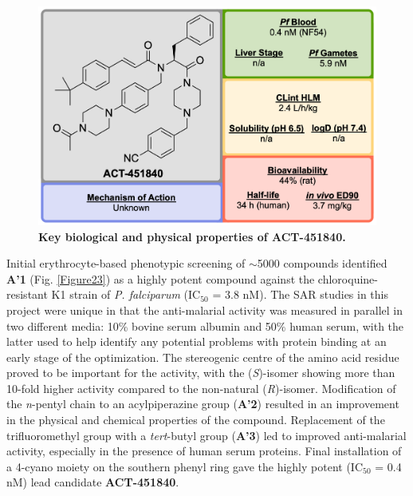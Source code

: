 \documentclass[twocolumn]{bmcart}%
\begin{document}
\begin{figure}[h]
	\includegraphics [scale=0.575] {Figure22}
	\caption{\bf Key biological and physical properties of ACT-451840.}
	\label{Figure22}
\end{figure}

Initial erythrocyte-based phenotypic screening of $\sim$5000 compounds identified \textbf{A'1} (Fig. \ref{Figure23}) as a highly potent compound against the chloroquine-resistant K1 strain of \textit{P. falciparum} (IC$_{50}$ = 3.8 nM). The SAR studies in this project were unique in that the anti-malarial activity was measured in parallel in two different media: 10\% bovine serum albumin and 50\% human serum, with the latter used to help identify any potential problems with protein binding at an early stage of the optimization. The stereogenic centre of the amino acid residue proved to be important for the activity, with the (\textit{S})-isomer showing more than 10-fold higher activity compared to the non-natural (\textit{R})-isomer. Modification of the \textit{n}-pentyl chain to an acylpiperazine group (\textbf{A'2}) resulted in an improvement in the physical and chemical properties of the compound. Replacement of the trifluoromethyl group with a \textit{tert}-butyl group (\textbf{A'3}) led to improved anti-malarial activity, especially in the presence of human serum proteins. Final installation of a 4-cyano moiety on the southern phenyl ring gave the highly potent (IC$_{50}$ = 0.4 nM) lead candidate \textbf{ACT-451840}.
\end{document}
